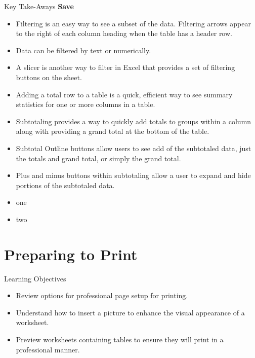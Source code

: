 \begin{center}
	\begin{tkwbox}{Key Take-Aways}
		\textbf{Save}
		\\
		\begin{itemize}
			\setlength{\itemsep}{0pt}
			\setlength{\parskip}{0pt}
			\setlength{\parsep}{0pt}

			\item Filtering is an easy way to see a subset of the data. Filtering arrows appear to the right of each column heading when the table has a header row.
			\item Data can be filtered by text or numerically.
			\item A slicer is another way to filter in Excel that provides a set of filtering buttons on the sheet.
			\item Adding a total row to a table is a quick, efficient way to see summary statistics for one or more columns in a table.
			\item Subtotaling provides a way to quickly add totals to groups within a column along with providing a grand total at the bottom of the table.
			\item Subtotal Outline buttons allow users to see add of the subtotaled data, just the totals and grand total, or simply the grand total.
			\item Plus and minus buttons within subtotaling allow a user to expand and hide portions of the subtotaled data.
			
			\item one
			\item two
			
		\end{itemize}
	\end{tkwbox}
\end{center}





\section{Preparing to Print}


\begin{center}
	\begin{objbox}{Learning Objectives}
		\begin{itemize}
			\setlength{\itemsep}{0pt}
			\setlength{\parskip}{0pt}
			\setlength{\parsep}{0pt}

			\item Review options for professional page setup for printing.
			\item Understand how to insert a picture to enhance the visual appearance of a worksheet.
			\item Preview worksheets containing tables to ensure they will print in a professional manner.
			
		\end{itemize}
	\end{objbox}
\end{center}







